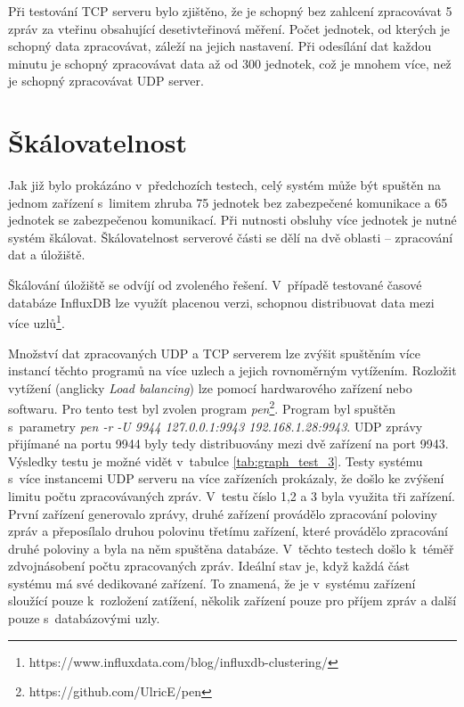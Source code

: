 Při testování TCP serveru bylo zjištěno, že je schopný bez zahlcení zpracovávat 5 zpráv za vteřinu obsahující desetivteřinová měření. Počet jednotek, od kterých je schopný data zpracovávat, záleží na jejich nastavení. Při odesílání dat každou minutu je schopný zpracovávat data až od 300 jednotek, což je mnohem více, než je schopný zpracovávat UDP server.

\section{Škálovatelnost} \label{sec:load_balancing}
Jak již bylo prokázáno v~předchozích testech, celý systém může být spuštěn na jednom zařízení s~limitem zhruba 75 jednotek bez zabezpečené komunikace a 65 jednotek se zabezpečenou komunikací. Při nutnosti obsluhy více jednotek je nutné systém škálovat. Škálovatelnost serverové části se dělí na dvě oblasti -- zpracování dat a úložiště. 

Škálování úložiště se odvíjí od zvoleného řešení. V~případě testované časové databáze InfluxDB lze využít placenou verzi, schopnou distribuovat data mezi více uzlů\footnote{https://www.influxdata.com/blog/influxdb-clustering/}.

Množství dat zpracovaných UDP a TCP serverem lze zvýšit spuštěním více instancí těchto programů na více uzlech a jejich rovnoměrným vytížením. Rozložit vytížení (anglicky \textit{Load balancing}) lze pomocí hardwarového zařízení nebo softwaru. Pro tento test byl zvolen program \textit{pen}\footnote{https://github.com/UlricE/pen}. Program byl spuštěn s~parametry \textit{pen -r -U 9944 127.0.0.1:9943 192.168.1.28:9943}. UDP zprávy přijímané na portu 9944 byly tedy distribuovány mezi dvě zařízení na port 9943. Výsledky testu je možné vidět v~tabulce \ref{tab:graph_test_3}. Testy systému s~více instancemi UDP serveru na více zařízeních prokázaly, že došlo ke zvýšení limitu počtu zpracovávaných zpráv. V~testu číslo 1,2 a 3 byla využita tři zařízení. První zařízení generovalo zprávy, druhé zařízení provádělo zpracování poloviny zpráv a přeposílalo druhou polovinu třetímu zařízení, které provádělo zpracování druhé poloviny a byla na něm spuštěna databáze. V~těchto testech došlo k~téměř zdvojnásobení počtu zpracovaných zpráv.
Ideální stav je, když každá část systému má své dedikované zařízení. To znamená, že je v~systému zařízení sloužící pouze k~rozložení zatížení, několik zařízení pouze pro příjem zpráv a další pouze s~databázovými uzly.


